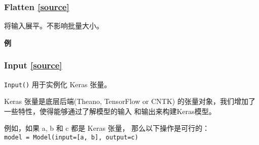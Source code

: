 \subsubsection{Flatten {\href{https://github.com/keras-team/keras/blob/master/keras/layers/core.py\#L465}{{[}source{]}}}}

\begin{Shaded}
\begin{Highlighting}[]
\end{Highlighting}
\end{Shaded}

将输入展平。不影响批量大小。

\textbf{例}

\begin{Shaded}
\begin{Highlighting}[]
\OperatorTok{=} 
\NormalTok{, }\NormalTok{, }\NormalTok{,}
                 \OperatorTok{=}\NormalTok{,}
                 \OperatorTok{=}\NormalTok{(}\NormalTok{, }\NormalTok{, }\NormalTok{)))}

\end{Highlighting}
\end{Shaded}


\subsubsection{Input {\href{https://github.com/keras-team/keras/blob/master/keras/engine/topology.py\#L1391}{{[}source{]}}}}

\begin{Shaded}
\begin{Highlighting}[]
\end{Highlighting}
\end{Shaded}

\texttt{Input()} 用于实例化 Keras 张量。

Keras 张量是底层后端(Theano, TensorFlow or CNTK)
的张量对象，我们增加了一些特性，使得能够通过了解模型的输入
和输出来构建Keras模型。

例如，如果 a, b 和 c 都是 Keras 张量， 那么以下操作是可行的：
\texttt{model\ =\ Model(input={[}a,\ b{]},\ output=c)}

